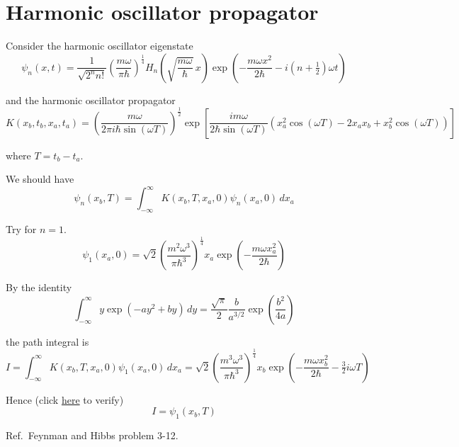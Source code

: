 

\section*{Harmonic oscillator propagator}

Consider the harmonic oscillator eigenstate
\begin{equation*}
\psi_n(x,t)=\frac{1}{\sqrt{2^nn!}}\left(\frac{m\omega}{\pi\hbar}\right)^\frac{1}{4}
H_n\left(\sqrt{\frac{m\omega}{\hbar}}\,x\right)
\exp\left(-\frac{m\omega x^2}{2\hbar}-i\left(n+\tfrac{1}{2}\right)\omega t\right)
\end{equation*}

and the harmonic oscillator propagator
\begin{equation*}
K(x_b,t_b,x_a,t_a)
=\left(\frac{m\omega}{2\pi i\hbar\sin(\omega T)}\right)^\frac{1}{2}
\exp\left[
\frac{im\omega}{2\hbar\sin(\omega T)}
\left(x_a^2\cos(\omega T)-2x_ax_b+x_b^2\cos(\omega T)\right)
\right]
\end{equation*}

where $T=t_b-t_a$.

\bigskip
We should have
\begin{equation*}
\psi_n(x_b,T)=\int_{-\infty}^\infty K(x_b,T,x_a,0)\psi_n(x_a,0)\,dx_a
\end{equation*}

Try for $n=1$.
\begin{equation*}
\psi_1(x_a,0)=\sqrt2\left(\frac{m^2\omega^3}{\pi\hbar^3}\right)^\frac{1}{4}
x_a\exp\left(-\frac{m\omega x_a^2}{2\hbar}\right)
\end{equation*}

By the identity
\begin{equation*}
\int_{-\infty}^\infty y\exp\left(-ay^2+by\right)\,dy
=\frac{\sqrt\pi}{2}\frac{b}{a^{3/2}}\exp\left(\frac{b^2}{4a}\right)
\end{equation*}

the path integral is
\begin{equation*}
I=\int_{-\infty}^\infty K(x_b,T,x_a,0)\psi_1(x_a,0)\,dx_a
=\sqrt2\left(\frac{m^3\omega^3}{\pi\hbar^3}\right)^\frac{1}{4}
x_b\exp\left(-\frac{m\omega x_b^2}{2\hbar}-\tfrac{3}{2}i\omega T\right)
\end{equation*}

Hence (click \href{https://georgeweigt.github.io/blog/10.html}{here} to verify)
\begin{equation*}
I=\psi_1(x_b,T)
\end{equation*}

Ref.~Feynman and Hibbs problem 3-12.

